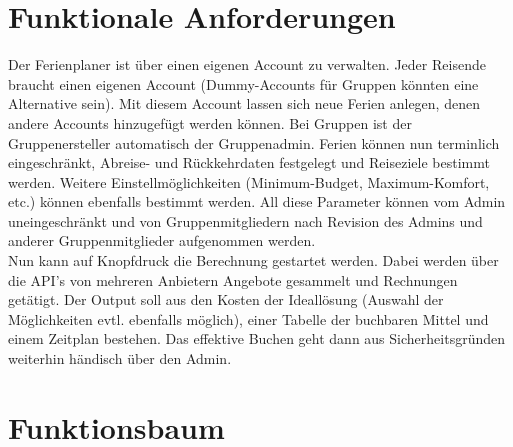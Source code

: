 \documentclass[10pt,a4paper,titlepage,twoside,german]{zhawreprt}
\begin{document}
\chapter{Funktionale Anforderungen}\label{chp:FunctionalRequirements}
Der Ferienplaner ist über einen eigenen Account zu verwalten. Jeder Reisende braucht einen eigenen Account (Dummy-Accounts für Gruppen könnten eine Alternative sein). Mit diesem Account lassen sich neue Ferien anlegen, denen andere Accounts hinzugefügt werden können. Bei Gruppen ist der Gruppenersteller automatisch der Gruppenadmin. Ferien können nun terminlich eingeschränkt, Abreise- und Rückkehrdaten festgelegt und Reiseziele bestimmt werden. Weitere Einstellmöglichkeiten (Minimum-Budget, Maximum-Komfort, etc.) können ebenfalls bestimmt werden. All diese Parameter können vom Admin uneingeschränkt und von Gruppenmitgliedern nach Revision des Admins und anderer Gruppenmitglieder aufgenommen werden.\\
Nun kann auf Knopfdruck die Berechnung gestartet werden. Dabei werden über die API's von mehreren Anbietern Angebote gesammelt und Rechnungen getätigt. Der Output soll aus den Kosten der Ideallösung (Auswahl der Möglichkeiten evtl. ebenfalls möglich), einer Tabelle der buchbaren Mittel und einem Zeitplan bestehen. Das effektive Buchen geht dann aus Sicherheitsgründen weiterhin händisch über den Admin.
\chapter{Funktionsbaum}\label{chp:FunctionTree}
\end{document}

